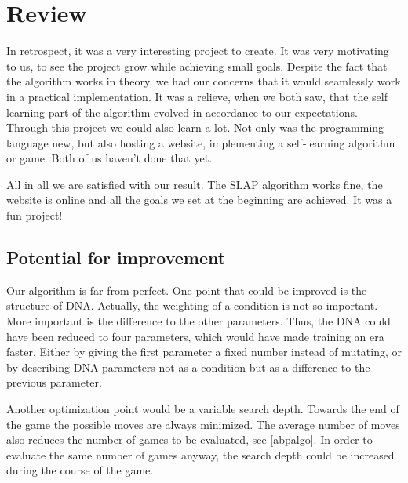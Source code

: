 \section{Review}
In retrospect, it was a very interesting project to create. It was very motivating to us, to see the project grow while achieving small goals. Despite the fact that the algorithm works in theory, we had our concerns that it would seamlessly work in a practical implementation. It was a relieve, when we both saw, that the self learning part of the algorithm evolved in accordance to our expectations. Through this project we could also learn a lot. Not only was the programming language new, but also hosting a website, implementing a self-learning algorithm or game. Both of us haven't done that yet.

All in all we are satisfied with our result. The SLAP algorithm works fine, the website is online and all the goals we set at the beginning are achieved. It was a fun project!

\subsection{Potential for improvement}
Our algorithm is far from perfect. One point that could be improved is the structure of DNA. Actually, the weighting of a condition is not so important. More important is the difference to the other parameters. Thus, the DNA could have been reduced to four parameters, which would have made training an era faster. Either by giving the first parameter a fixed number instead of mutating, or by describing DNA parameters not as a condition but as a difference to the previous parameter.

Another optimization point would be a variable search depth. Towards the end of the game the possible moves are always minimized. The average number of moves also reduces the number of games to be evaluated, see \autoref{abpalgo}. In order to evaluate the same number of games anyway, the search depth could be increased during the course of the game.
